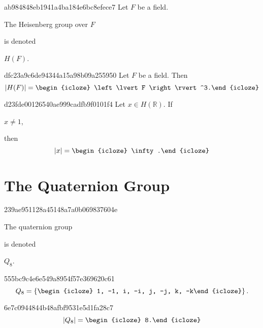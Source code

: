 \begin{note}{ab984848eb1941a4ba184e6bc8efece7}
    Let \({ F }\) be a field. \begin{icloze}{1}The Heisenberg group over \({ F }\)\end{icloze} is denoted \begin{icloze}{2}\({ H(F) }\).\end{icloze}
\end{note}

\begin{note}{dfc23a9c6de94344a15a98b09a255950}
    Let \({ F }\) be a field. Then
    \[
        \left\lvert H(F) \right\rvert = \begin{icloze}{1}\left\lvert F \right\rvert^3.\end{icloze}
    \]
\end{note}

\begin{note}{d23fde00126540ae999cadfb9f0101f4}
    Let \({ x \in H(\mathbb R) }\). If \begin{icloze}{2}\({ x \neq 1 }\),\end{icloze} then
    \[
        \left\lvert x \right\rvert = \begin{icloze}{1}\infty.\end{icloze}
    \]
\end{note}

\section{The Quaternion Group}

\begin{note}{239ae951128a45148a7a0b069837604e}
    \begin{icloze}{2}The quaternion group\end{icloze} is denoted \begin{icloze}{1}\({ Q_{8} }\).\end{icloze}
\end{note}

\begin{note}{555bc9c4e6e549a8954f57e369620c61}
    \[
        Q_8 = \left\{ \begin{icloze}{1}1, -1, i, -i, j, -j, k, -k\end{icloze} \right\}.
    \]
\end{note}

\begin{note}{6e7c0944844b48afbf9531e5d1fa28c7}
    \[
        \left\lvert Q_8 \right\rvert = \begin{icloze}{1}8.\end{icloze}
    \]
\end{note}


